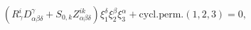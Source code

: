 \begin{equation}
\left( R_{\gamma }^{i}D_{\alpha \beta \delta }^{\gamma }+S_{0,k}Z_{\alpha
\beta \delta }^{ik}\right) \xi _{1}^{\delta }\xi _{2}^{\beta }\xi
_{3}^{\alpha }+\mathrm{cycl.perm.}(1,2,3)=0,  \label{GAnR}
\end{equation}

